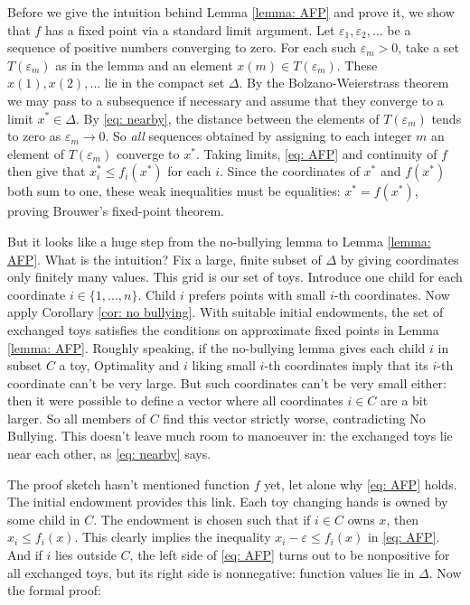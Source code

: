 \documentclass[english, 11pt]{article}
\theoremstyle{plain} %
\theoremstyle{definition}
\begin{document}
Before we give the intuition behind Lemma \ref{lemma: AFP} and prove it, we show that $f$ has a fixed point via a standard limit argument. Let $\varepsilon_1, \varepsilon_2, \ldots$ be a sequence of positive numbers converging to zero. For each such $\varepsilon_m > 0$, take a set $T(\varepsilon_m)$ as in the lemma and an element $x(m) \in T(\varepsilon_m)$. These $x(1), x(2), \ldots$ lie in the compact set $\Delta$. By the Bolzano-Weierstrass theorem we may pass to a subsequence if necessary and assume that they converge to a limit $x^* \in \Delta$. By \eqref{eq: nearby}, the distance between the elements of $T(\varepsilon_m)$ tends to zero as $\varepsilon_m \to 0$. So \emph{all\/} sequences obtained by assigning to each integer $m$ an element of $T(\varepsilon_m)$ converge to $x^*$. Taking limits, \eqref{eq: AFP} and continuity of $f$ then give that $x^*_i \leq f_i(x^*)$ for each $i$. Since the coordinates of $x^*$ and $f(x^*)$ both sum to one, these weak inequalities must be equalities: $x^* = f(x^*)$, proving Brouwer's fixed-point theorem.

But it looks like a huge step from the no-bullying lemma to Lemma \ref{lemma: AFP}. What is the intuition? Fix a large, finite subset of $\Delta$ by giving coordinates only finitely many values. This grid is our set of toys. Introduce one child for each coordinate $i \in \{1, \ldots, n\}$. Child $i$ prefers points with small $i$-th coordinates. Now apply Corollary \ref{cor: no bullying}. With suitable initial endowments, the set of exchanged toys satisfies the conditions on approximate fixed points in Lemma \ref{lemma: AFP}. Roughly speaking, if the no-bullying lemma gives each child $i$ in subset $C$ a toy, Optimality and $i$ liking small $i$-th coordinates imply that its $i$-th coordinate can't be very large. But such coordinates can't be very small either: then it were possible to define a vector where all coordinates $i \in C$ are a bit larger. So all members of $C$ find this vector strictly worse, contradicting No Bullying. This doesn't leave much room to manoeuver in: the exchanged toys lie near each other, as \eqref{eq: nearby} says.

The proof sketch hasn't mentioned function $f$ yet, let alone why \eqref{eq: AFP} holds. The initial endowment provides this link. Each toy changing hands is owned by some child in $C$. The endowment is chosen such that if $i \in C$ owns $x$, then $x_i \leq f_i(x)$. This clearly implies the inequality $x_i - \varepsilon \leq f_i(x)$ in \eqref{eq: AFP}. And if $i$ lies outside $C$, the left side of \eqref{eq: AFP} turns out to be nonpositive for all exchanged toys, but its right side is nonnegative: function values lie in $\Delta$. Now the formal proof:
\end{document}
